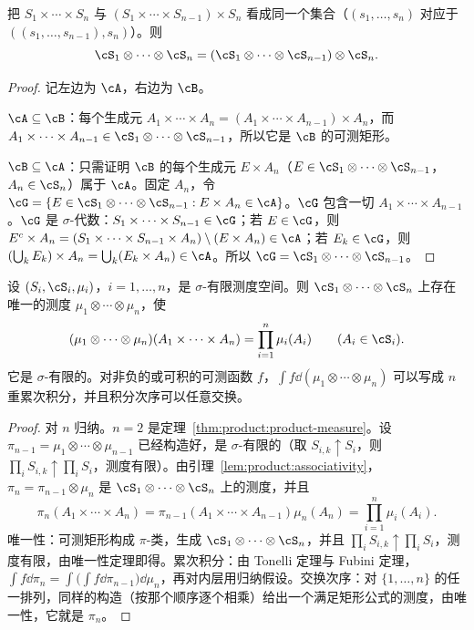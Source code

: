 \begin{lemma}\label{lem:product:associativity}
把 $S_1\times\cdots\times S_n$ 与 $(S_1\times\cdots\times S_{n-1})\times S_n$ 看成同一个集合（$(s_1,\dots,s_n)$ 对应于 $((s_1,\dots,s_{n-1}),s_n)$）。则
\[
\cS_1\otimes\cdots\otimes\cS_n=(\cS_1\otimes\cdots\otimes\cS_{n-1})\otimes\cS_n .
\]
\end{lemma}
\begin{proof}
记左边为 $\cA$，右边为 $\cB$。

$\cA\subseteq\cB$：每个生成元 $A_1\times\cdots\times A_n=(A_1\times\cdots\times A_{n-1})\times A_n$，而 $A_1\times\cdots\times A_{n-1}\in\cS_1\otimes\cdots\otimes\cS_{n-1}$，所以它是 $\cB$ 的可测矩形。

$\cB\subseteq\cA$：只需证明 $\cB$ 的每个生成元 $E\times A_n$（$E\in\cS_1\otimes\cdots\otimes\cS_{n-1}$，$A_n\in\cS_n$）属于 $\cA$。固定 $A_n$，令 $\cG=\{E\in\cS_1\otimes\cdots\otimes\cS_{n-1}:E\times A_n\in\cA\}$。$\cG$ 包含一切 $A_1\times\cdots\times A_{n-1}$。$\cG$ 是 $\sigma$-代数：$S_1\times\cdots\times S_{n-1}\in\cG$；若 $E\in\cG$，则 $E^c\times A_n=(S_1\times\cdots\times S_{n-1}\times A_n)\setminus(E\times A_n)\in\cA$；若 $E_k\in\cG$，则 $(\bigcup_kE_k)\times A_n=\bigcup_k(E_k\times A_n)\in\cA$。所以 $\cG=\cS_1\otimes\cdots\otimes\cS_{n-1}$。
\end{proof}

\begin{theorem}[有限个测度的乘积]\label{thm:product:finite-product}
设 $(S_i,\cS_i,\mu_i)$，$i=1,\dots,n$，是 $\sigma$-有限测度空间。则 $\cS_1\otimes\cdots\otimes\cS_n$ 上存在唯一的测度 $\mu_1\otimes\cdots\otimes\mu_n$，使
\[
(\mu_1\otimes\cdots\otimes\mu_n)(A_1\times\cdots\times A_n)=\prod_{i=1}^n\mu_i(A_i)\qquad(A_i\in\cS_i).
\]
它是 $\sigma$-有限的。对非负的或可积的可测函数 $f$，$\int f\dd(\mu_1\otimes\cdots\otimes\mu_n)$ 可以写成 $n$ 重累次积分，并且积分次序可以任意交换。
\end{theorem}
\begin{proof}
对 $n$ 归纳。$n=2$ 是定理~\ref{thm:product:product-measure}。设 $\pi_{n-1}=\mu_1\otimes\cdots\otimes\mu_{n-1}$ 已经构造好，是 $\sigma$-有限的（取 $S_{i,k}\uparrow S_i$，则 $\prod_iS_{i,k}\uparrow\prod_iS_i$，测度有限）。由引理~\ref{lem:product:associativity}，$\pi_n=\pi_{n-1}\otimes\mu_n$ 是 $\cS_1\otimes\cdots\otimes\cS_n$ 上的测度，并且
\[
\pi_n(A_1\times\cdots\times A_n)=\pi_{n-1}(A_1\times\cdots\times A_{n-1})\mu_n(A_n)=\prod_{i=1}^n\mu_i(A_i).
\]
唯一性：可测矩形构成 $\pi$-类，生成 $\cS_1\otimes\cdots\otimes\cS_n$，并且 $\prod_iS_{i,k}\uparrow\prod_iS_i$，测度有限，由唯一性定理即得。累次积分：由 Tonelli 定理与 Fubini 定理，$\int f\dd\pi_n=\int\bigl(\int f\dd\pi_{n-1}\bigr)\dd\mu_n$，再对内层用归纳假设。交换次序：对 $\{1,\dots,n\}$ 的任一排列，同样的构造（按那个顺序逐个相乘）给出一个满足矩形公式的测度，由唯一性，它就是 $\pi_n$。
\end{proof}

